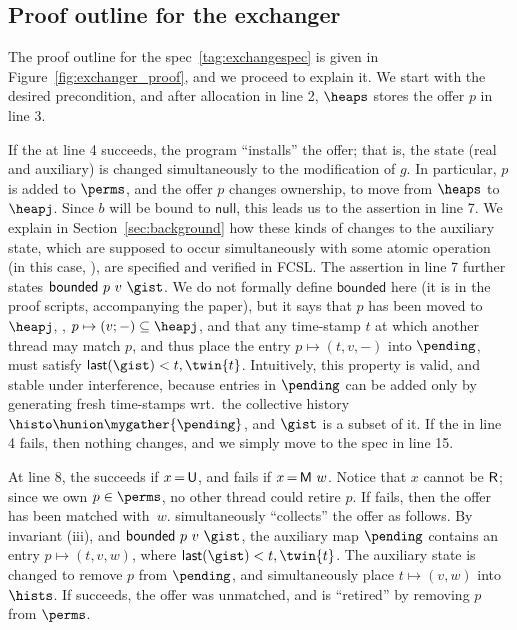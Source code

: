 \subsection{Proof outline for the exchanger}
\label{sec:exproof}

The proof outline for the spec~\eqref{tag:exchangespec} is given in
Figure~\ref{fig:exchanger_proof}, and we proceed to explain it.
%
We start with the desired precondition, and after allocation in line
2, $\heaps$ stores the offer $p$ in line 3.

If the  at line 4 succeeds, the program ``installs'' the
offer; that is, the state (real and auxiliary) is changed
simultaneously to the modification of $g$. In particular, $p$ is added
to $\perms$, and the offer $p$ changes ownership, to move from
$\heaps$ to $\heapj$.  Since $b$ will be bound to $\mathsf{null}$,
this leads us to the assertion in line 7. We explain in
Section~\ref{sec:background} how these kinds of changes to the
auxiliary state, which are supposed to occur simultaneously with some
atomic operation (in this case, ), are specified and
verified in FCSL. The assertion in line 7 further states
$\mathsf{bounded}\ p\ v\ \gist$. We do not formally define
$\mathsf{bounded}$ here (it is in the proof scripts, accompanying the
paper), but it says that $p$ has been moved to $\heapj$, \ie,
$p \mapsto (v; -) \subseteq \heapj$, and that any time-stamp $t$ at
which another thread may match $p$, and thus place the entry
$p \mapsto (t, v,-)$ into $\pending$, must satisfy
$\mathsf{last}(\gist) < t, \twin{t}$. Intuitively, this property is
valid, and stable under interference, because entries in $\pending$
can be added only by generating fresh time-stamps wrt.~the collective
history $\histo \hunion \mygather{\pending}$, and $\gist$ is a subset
of it.
%
If the  in line 4 fails, then nothing changes, and we simply move
to the spec in line 15.

At line 8, the  succeeds if $x\,{=}\,{\mathsf{U}}$, and fails if
$x\,{=}\,{\mathsf{M}\ w}$. Notice that $x$ cannot be ${\mathsf{R}}$; since we
own $p \in \perms$, no other thread could retire $p$.
%
If  fails, then the offer has been matched with~$w$. 
simultaneously ``collects'' the offer as follows. By invariant (iii),
and $\mathsf{bounded}\ p\ v\ \gist$, the auxiliary map $\pending$
contains an entry $p \mapsto (t, v, w)$, where $\mathsf{last}(\gist) <
t, \twin{t}$. The auxiliary state is changed to remove $p$ from
$\pending$, and simultaneously place $t \mapsto (v, w)$ into $\hists$.
%
If  succeeds, the offer was unmatched, and is ``retired'' by
removing $p$ from $\perms$.

